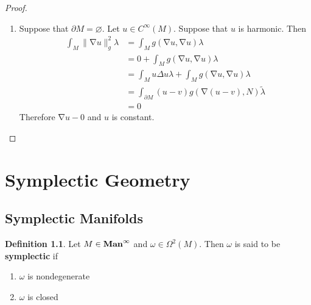 \documentclass{book}
\theoremstyle{definition}
\newtheorem{defn}[definition]{Definition}
\newcommand{\lam}{\lambda}
\newcommand{\om}{\omega}
\newcommand{\Del}{\Delta}
\newcommand{\Om}{\Omega}
\DeclareMathOperator{\nab}{\nabla}
\DeclareMathOperator*{\Maninf}{\text{\tbf{Man}}^{\infty}}
\DeclareMathOperator*{\0}{\mbf{0}}
\DeclareMathOperator*{\1}{\mbf{1}}
\newcommand{\tbf}[1]{\textbf{#1}}
\newcommand{\p}{\partial}
\begin{document}
\begin{proof}
\begin{enumerate}
\begin{enumerate}
			\item Suppose that $\p M = \varnothing$. Let $u \in C^{\infty}(M)$. Suppose that $u$ is harmonic. Then
			\begin{align*}
				\int_M \|\nab u\|_g^2 \lam 
				& = \int_M g(\nab u, \nab u) \lam \\
				& = 0 + \int_M g(\nab u, \nab u) \lam \\
				& = \int_{M} u \Del u \lam + \int_M g(\nab u, \nab u) \lam \\
				& = \int_{\p M} (u-v) g(\nab (u-v), N) \tilde{\lam} \\
				& = 0
			\end{align*}
			Therefore $\nab u - 0$ and $u$ is constant.
		\end{enumerate}
	\end{enumerate}
\end{proof}



















	\newpage
	\chapter{Symplectic Geometry}
	
	
	
	
	
	
	
	
	
	
	
	
	
	
	
	
	
	
	
	
	
	
	
	
	
	
	
	\newpage
	\section{Symplectic Manifolds}
	
	\begin{defn}
		Let $M \in \Maninf$ and $\om \in \Om^2(M)$. Then $\om$ is said to be \tbf{symplectic} if 
		\begin{enumerate}
			\item $\om$ is nondegenerate
			\item $\om$ is closed
		\end{enumerate} 
	\end{defn}
	
\end{document}
